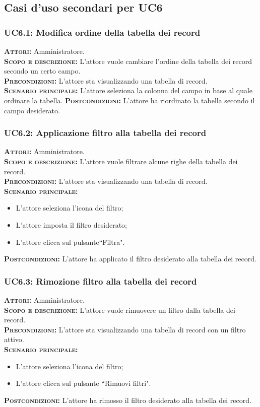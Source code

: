\subsection{Casi d'uso secondari per UC6}
\subsubsection{UC6.1: Modifica ordine della tabella dei record}
\label{sec:UC61}
\textsc{\textbf{Attori:}} Amministratore.\\
\textsc{\textbf{Scopo e descrizione:}} L'attore vuole cambiare l'ordine della tabella dei record secondo un certo campo.\\
\textsc{\textsc{\textbf{Precondizioni:}}} L'attore sta visualizzando una tabella di record.\\
\textsc{\textbf{Scenario principale:}} L'attore seleziona la colonna del campo in base al quale ordinare la tabella.
\textsc{\textbf{Postcondizioni:}} L'attore ha riordinato la tabella secondo il campo desiderato.

\subsubsection{UC6.2: Applicazione filtro alla tabella dei record}
\label{sec:UC62}
\textsc{\textbf{Attori:}} Amministratore.\\
\textsc{\textbf{Scopo e descrizione:}} L'attore vuole filtrare alcune righe della tabella dei record.\\
\textsc{\textsc{\textbf{Precondizioni:}}} L'attore sta visualizzando una tabella di record.\\
\textsc{\textbf{Scenario principale:}} 
\begin{itemize}
    \item L'attore seleziona l'icona del filtro;
    \item L'attore imposta il filtro desiderato;
    \item L'attore clicca sul pulsante``Filtra".
\end{itemize}
\textsc{\textbf{Postcondizioni:}} L'attore ha applicato il filtro desiderato alla tabella dei record.

\subsubsection{UC6.3: Rimozione filtro alla tabella dei record}
\label{sec:UC63}
\textsc{\textbf{Attori:}} Amministratore.\\
\textsc{\textbf{Scopo e descrizione:}} L'attore vuole rimuovere un filtro dalla tabella dei record.\\
\textsc{\textsc{\textbf{Precondizioni:}}} L'attore sta visualizzando una tabella di record con un filtro attivo.\\
\textsc{\textbf{Scenario principale:}} 
\begin{itemize}
    \item L'attore seleziona l'icona del filtro;
    \item L'attore clicca sul pulsante ``Rimuovi filtri".
\end{itemize}
\textsc{\textbf{Postcondizioni:}} L'attore ha rimosso il filtro desiderato alla tabella dei record.

